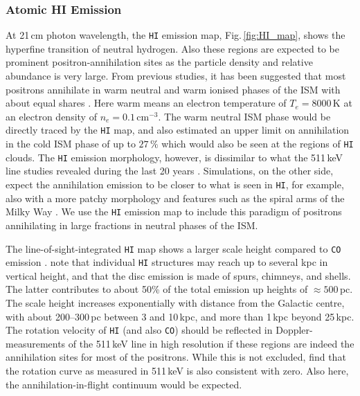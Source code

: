 \documentclass[doublespace,nopageskip]{VTthesis} %
\newcommand{\mrm}[1]{\mathrm{#1}}
\begin{document}
\subsubsection{Atomic HI Emission}

At 21\,cm photon wavelength, the \texttt{HI} emission map, Fig.\,\ref{fig:HI_map}, shows the hyperfine transition of neutral hydrogen.
%
Also these regions are expected to be prominent positron-annihilation sites as the particle density and relative abundance is very large.
%
From previous studies, it has been suggested that most positrons annihilate in warm neutral and warm ionised phases of the ISM with about equal shares \citep{Jean2006_511}.
%
Here warm means an electron temperature of $T_e = 8000\,\mrm{K}$ at an electron density of $n_e = 0.1\,\mrm{cm^{-3}}$.
%
The warm neutral ISM phase would be directly traced by the \texttt{HI} map, and \citet{Jean2006_511} also estimated an upper limit on annihilation in the cold ISM phase of up to $27\,\%$ which would also be seen at the regions of \texttt{HI} clouds.
%
The \texttt{HI} emission morphology, however, is dissimilar to what the 511\,keV line studies revealed during the last 20 years \citep{Purcell1997_511,Knoedlseder2005_511,Siegert2016_511,Siegert2019_lv511,Skinner2014_511,Churazov2011_511}.
%
Simulations, on the other side, expect the annihilation emission to be closer to what is seen in \texttt{HI}, for example, also with a more patchy morphology and features such as the spiral arms of the Milky Way \citep{Alexis2014_511ISM,Panther2018_pos_transport}.
%
We use the \texttt{HI} emission map to include this paradigm of positrons annihilating in large fractions in neutral phases of the ISM. 

The line-of-sight-integrated \texttt{HI} map shows a larger scale height compared to \texttt{CO} emission \citep{Dickey1990_HI}.
%
\citet{Kalberla2009_HI} note that individual \texttt{HI} structures may reach up to several kpc in vertical height, and that the disc emission is made of spurs, chimneys, and shells.
%
The latter contributes to about 50\% of the total emission up heights of $\approx 500$\,pc.
%
The scale height increases exponentially with distance from the Galactic centre, with about 200--300\,pc between 3 and 10\,kpc, and more than 1\,kpc beyond 25\,kpc.
%
The rotation velocity of \texttt{HI} (and also \texttt{CO}) should be reflected in Doppler-measurements of the 511\,keV line in high resolution if these regions are indeed the annihilation sites for most of the positrons.
%
While this is not excluded, \citet{Siegert2019_lv511} find that the rotation curve as measured in 511\,keV is also consistent with zero.
%
Also here, the annihilation-in-flight continuum would be expected.
\end{document}
